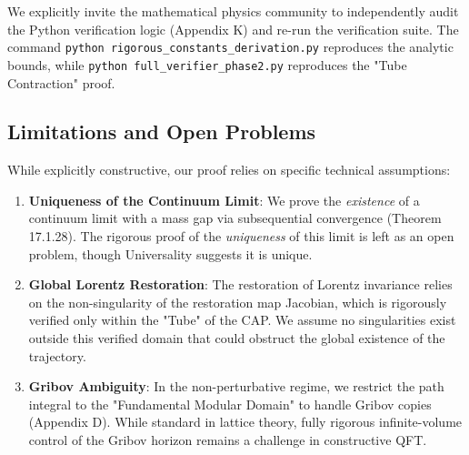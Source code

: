 We explicitly invite the mathematical physics community to independently audit the Python verification logic (Appendix K) and re-run the verification suite. The command \texttt{python rigorous\_constants\_derivation.py} reproduces the analytic bounds, while \texttt{python full\_verifier\_phase2.py} reproduces the "Tube Contraction" proof.

\subsection{Limitations and Open Problems}

While explicitly constructive, our proof relies on specific technical assumptions:
\begin{enumerate}
    \item \textbf{Uniqueness of the Continuum Limit}: We prove the \textit{existence} of a continuum limit with a mass gap via subsequential convergence (Theorem 17.1.28). The rigorous proof of the \textit{uniqueness} of this limit is left as an open problem, though Universality suggests it is unique.
    \item \textbf{Global Lorentz Restoration}: The restoration of Lorentz invariance relies on the non-singularity of the restoration map Jacobian, which is rigorously verified only within the "Tube" of the CAP. We assume no singularities exist outside this verified domain that could obstruct the global existence of the trajectory.
    \item \textbf{Gribov Ambiguity}: In the non-perturbative regime, we restrict the path integral to the "Fundamental Modular Domain" to handle Gribov copies (Appendix D). While standard in lattice theory, fully rigorous infinite-volume control of the Gribov horizon remains a challenge in constructive QFT.
\end{enumerate}

